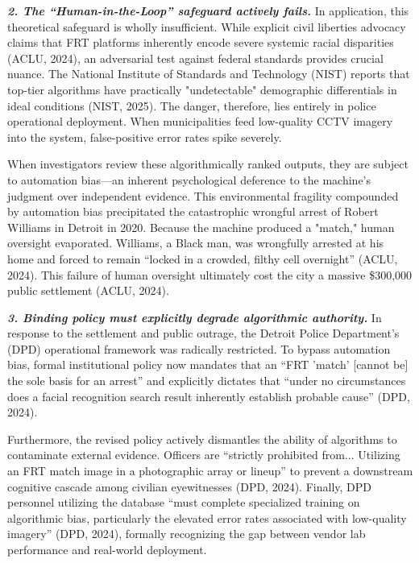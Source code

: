 \documentclass[11pt, twocolumn]{article}
\begin{document}
\textbf{\textit{2. The ``Human-in-the-Loop'' safeguard actively fails.}}
In application, this theoretical safeguard is wholly insufficient. While explicit civil liberties advocacy claims that FRT platforms inherently encode severe systemic racial disparities (ACLU, 2024), an adversarial test against federal standards provides crucial nuance. The National Institute of Standards and Technology (NIST) reports that top-tier algorithms have practically "undetectable" demographic differentials in ideal conditions (NIST, 2025). The danger, therefore, lies entirely in police operational deployment. When municipalities feed low-quality CCTV imagery into the system, false-positive error rates spike severely. 

When investigators review these algorithmically ranked outputs, they are subject to automation bias---an inherent psychological deference to the machine's judgment over independent evidence. This environmental fragility compounded by automation bias precipitated the catastrophic wrongful arrest of Robert Williams in Detroit in 2020. Because the machine produced a "match," human oversight evaporated. Williams, a Black man, was wrongfully arrested at his home and forced to remain ``locked in a crowded, filthy cell overnight'' (ACLU, 2024). This failure of human oversight ultimately cost the city a massive \$300,000 public settlement (ACLU, 2024).

\textbf{\textit{3. Binding policy must explicitly degrade algorithmic authority.}}
In response to the settlement and public outrage, the Detroit Police Department's (DPD) operational framework was radically restricted. To bypass automation bias, formal institutional policy now mandates that an ``FRT 'match' [cannot be] the sole basis for an arrest'' and explicitly dictates that ``under no circumstances does a facial recognition search result inherently establish probable cause'' (DPD, 2024). 

Furthermore, the revised policy actively dismantles the ability of algorithms to contaminate external evidence. Officers are ``strictly prohibited from... Utilizing an FRT match image in a photographic array or lineup'' to prevent a downstream cognitive cascade among civilian eyewitnesses (DPD, 2024). Finally, DPD personnel utilizing the database ``must complete specialized training on algorithmic bias, particularly the elevated error rates associated with low-quality imagery'' (DPD, 2024), formally recognizing the gap between vendor lab performance and real-world deployment.
\end{document}

